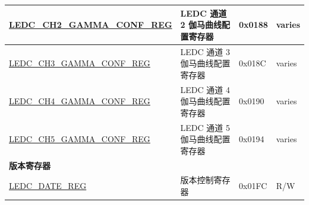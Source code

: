 \begin{longtable}{ | p{6cm} | p{7.2cm} | p{1.3cm} | p{1cm} | }
\hyperref[regdesc:LEDCCHNGAMMACONFREG]{LEDC\_CH2\_GAMMA\_CONF\_REG} & LEDC 通道 2 伽马曲线配置寄存器 & 0x0188 & varies \\ \hline
\hyperref[regdesc:LEDCCHNGAMMACONFREG]{LEDC\_CH3\_GAMMA\_CONF\_REG} & LEDC 通道 3 伽马曲线配置寄存器 & 0x018C & varies \\ \hline
\hyperref[regdesc:LEDCCHNGAMMACONFREG]{LEDC\_CH4\_GAMMA\_CONF\_REG} & LEDC 通道 4 伽马曲线配置寄存器 & 0x0190 & varies \\ \hline
\hyperref[regdesc:LEDCCHNGAMMACONFREG]{LEDC\_CH5\_GAMMA\_CONF\_REG} & LEDC 通道 5 伽马曲线配置寄存器 & 0x0194 & varies \\ \hline
\multicolumn{4}{|l|}{\textbf{版本寄存器}} \\ \hline
\hyperref[regdesc:LEDCDATEREG]{LEDC\_DATE\_REG} & 版本控制寄存器 & 0x01FC & R/W \\ \hline
\end{longtable}
